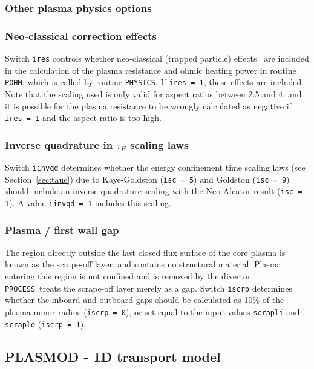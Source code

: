 \documentclass[11pt,a4paper]{report}
\newcommand{\process}{\mbox{\texttt{PROCESS}}}
\begin{document}
\subsubsection{Other plasma physics options}

\subsubsection*{Neo-classical correction effects}

Switch \texttt{ires} controls whether neo-classical (trapped particle) 
effects~\cite{Uckan} are included in the calculation of the plasma resistance
and ohmic heating power in routine \texttt{POHM}, which is called by routine
\texttt{PHYSICS}. If \texttt{ires = 1}, these effects are included. Note that
the scaling used is only valid for aspect ratios between 2.5 and 4, and it is
possible for the plasma resistance to be wrongly calculated as negative if
\texttt{ires = 1} and the aspect ratio is too high.

\subsubsection*{Inverse quadrature in $\tau_E$ scaling laws}

Switch \texttt{iinvqd} determines whether the energy confinement time scaling
laws (see Section~\ref{sec:taue}) due to Kaye-Goldston (\texttt{isc = 5}) and
Goldston (\texttt{isc = 9}) should include an inverse quadrature scaling with
the Neo-Alcator result (\texttt{isc = 1}). A value \texttt{iinvqd = 1}
includes this scaling.

\subsubsection*{Plasma / first wall gap}

The region directly outside the last closed flux surface of the core plasma is
known as the scrape-off layer, and contains no structural material.  Plasma
entering this region is not confined and is removed by the divertor. \process\
treats the scrape-off layer merely as a gap. Switch \texttt{iscrp} determines
whether the inboard and outboard gaps should be calculated as 10\% of the
plasma minor radius (\texttt{iscrp = 0}), or set equal to the input values
\texttt{scrapli} and \texttt{scraplo} (\texttt{iscrp = 1}).

\subsection{PLASMOD - 1D transport model}
\label{sec:plasmod}
\end{document}
